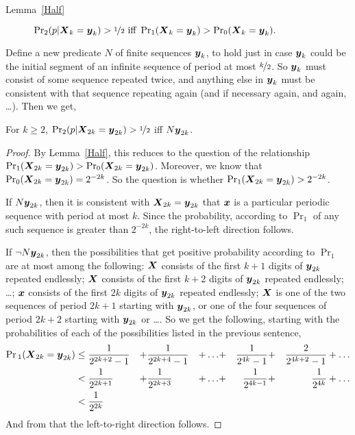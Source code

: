 \begin{description}
\item[Lemma~\ref{Half}] $\Pr_2(p | \boldsymbol{X}_k = \boldsymbol{y}_k) > \nicefrac{1}{2} \text{ iff } \Pr_1(\boldsymbol{X}_k = \boldsymbol{y}_k) > \Pr_0(\boldsymbol{X}_k = \boldsymbol{y}_k).$
\end{description}
%
\noindent Define a new predicate $N$ of finite sequences $\boldsymbol{y}_k$, to hold just in case $\boldsymbol{y}_k$ could be the initial segment of an infinite sequence of period at most $\nicefrac{k}{2}$. So $\boldsymbol{y}_k$ must consist of some sequence repeated twice, and anything else in $\boldsymbol{y}_k$ must be consistent with that sequence repeating again (and if necessary again, and again, \dots). Then we get,

\begin{lemma}
\label{DoubleSequence}
For $k \geq 2$, $\Pr_2(p | \boldsymbol{X}_{2k} = \boldsymbol{y}_{2k}) > \nicefrac{1}{2}$ iff $N\boldsymbol{y}_{2k}$.
\end{lemma}
\begin{proof}
By Lemma~\ref{Half}, this reduces to the question of the relationship $\Pr_1(\boldsymbol{X}_{2k} = \boldsymbol{y}_{2k}) > \Pr_0(\boldsymbol{X}_{2k} = \boldsymbol{y}_{2k})$. Moreover, we know that $\Pr_0(\boldsymbol{X}_{2k} = \boldsymbol{y}_{2k}) = 2^{-2k}$. So the question is whether $\Pr_1(\boldsymbol{X}_{2k} = \boldsymbol{y}_{2k}) > 2^{-2k}$. 

If $N\boldsymbol{y}_{2k}$, then it is consistent with $\boldsymbol{X}_{2k} = \boldsymbol{y}_{2k}$ that $\boldsymbol{x}$ is a particular periodic sequence with period at most $k$. Since the probability, according to $\Pr_1$ of any such sequence is greater than $2^{-2k}$, the right-to-left direction follows.

If $\neg N\boldsymbol{y}_{2k}$, then the possibilities that get positive probability according to $\Pr_1$ are at most among the following: $\boldsymbol{X}$ consists of the first $k + 1$ digits of $\boldsymbol{y}_{2k}$ repeated endlessly; $\boldsymbol{X}$ consists of the first $k + 2$ digits of $\boldsymbol{y}_{2k}$ repeated endlessly; \dots; $\boldsymbol{x}$ consists of the first $2k$ digits of $\boldsymbol{y}_{2k}$ repeated endlessly; $\boldsymbol{X}$ is one of the two sequences of period $2k + 1$ starting with $\boldsymbol{y}_{2k}$, or one of the four sequences of period $2k+2$ starting with $\boldsymbol{y}_{2k}$ or \dots. So we get the following, starting with the probabilities of each of the possibilities listed in the previous sentence,
%
\begin{align}
\Pr{}_1(\vX_{2k} = \vy_{2k}) 
	&\leq \frac{1}{2^{2k+2}-1} 
	&+ &\frac{1}{2^{2k+4}-1} 
	&+ \dots 
	&+ &\frac{1}{2^{4k}-1} 
	&+ &\frac{2}{2^{4k+2}-1} 
	&+ \dots \\
%
	&< \frac{1}{2^{2k+1}} 
	&+ &\frac{1}{2^{2k+3}} 
	&+ \dots
	&+ &\frac{1}{2^{4k-1}}
	&+ &\frac{1}{2^{4k}}
	&+ \dots \\
%
	&< \frac{1}{2^{2k}}
\end{align}
%
And from that the left-to-right direction follows.
\end{proof}
